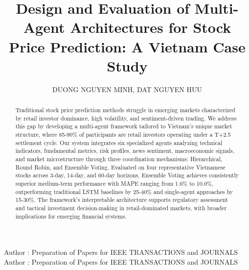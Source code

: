 \documentclass{ieeeaccess}
\begin{document}
\title{Design and Evaluation of Multi-Agent Architectures
for Stock Price Prediction: A Vietnam Case Study}
\author{
    \uppercase{Duong Nguyen Minh}, 
    \uppercase{Dat Nguyen Huu}
}

\address[1]{School of Computing, Phenikaa University, Vietnam\\
(e-mail: 23010441@st.phenikaa-uni.edu.vn)}

\address[2]{School of Computing, Phenikaa University, Vietnam\\
(e-mail: dat.nguyenhuu@phenikaa-uni.edu.vn)}



\markboth
{Author \headeretal: Preparation of Papers for IEEE TRANSACTIONS and JOURNALS}
{Author \headeretal: Preparation of Papers for IEEE TRANSACTIONS and JOURNALS}



\begin{abstract}
Traditional stock price prediction methods struggle in emerging markets characterized by retail investor dominance, high volatility, and sentiment-driven trading. We address this gap by developing a multi-agent framework tailored to Vietnam's unique market structure, where 85-90\% of participants are retail investors operating under a T+2.5 settlement cycle. Our system integrates six specialized agents analyzing technical indicators, fundamental metrics, risk profiles, news sentiment, macroeconomic signals, and market microstructure through three coordination mechanisms: Hierarchical, Round Robin, and Ensemble Voting. Evaluated on four representative Vietnamese stocks across 3-day, 14-day, and 60-day horizons, Ensemble Voting achieves consistently superior medium-term performance with MAPE ranging from 1.6\% to 10.0\%, outperforming traditional LSTM baselines by 25-40\% and single-agent approaches by 15-30\%. The framework's interpretable architecture supports regulatory assessment and tactical investment decision-making in retail-dominated markets, with broader implications for emerging financial systems.

\end{abstract}
\end{document}
